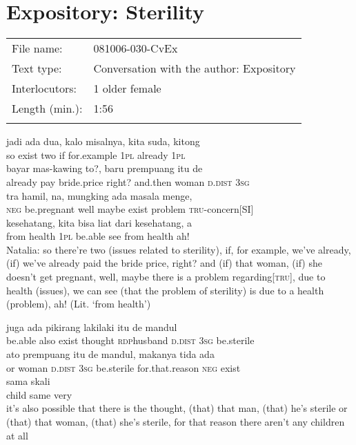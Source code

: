 \section{Expository: Sterility}
\label{Para_B.8}
\begin{tabular}{ll}
\lsptoprule
File name: &  081006-030-CvEx\\
Text type: &  Conversation with the author: Expository\\
Interlocutors: &  1 older female\\
Length (min.): &  1:56\\
\lspbottomrule
\end{tabular}
\setcounter{equation}{0}
\ea
{}   jadi    {ada}    {dua,}    {kalo}    {misalnya,}   kita    {suda,}    {kitong}\\
   {}   so    {exist}    {two}    {if}    {for.example}   \textsc{1pl}    {already}    {\textsc{1pl}}\\
    {bayar}    {mas-kawing}    {to?,}    {baru}    {prempuang}    {itu}   de\\
   {already}    {pay}    {bride.price}    {right?}    {and.then}    {woman}    {\textsc{d.dist}}   \textsc{3sg}\\
\gll tra    {hamil,}    {na,}    {mungking}    {ada}    {masala}    {menge,}\\
  \textsc{neg}    {be.pregnant}    {well}    {maybe}    {exist}    {problem}    {\textsc{tru}{}-concern[SI]}\\
    {kesehatang,}    {kita}    {bisa}    {liat}    {dari}    {kesehatang,}    {a}\\
   {from}    {health}    {\textsc{1pl}}    {be.able}    {see}    {from}    {health}    {ah!}\\
\glt
Natalia: so there’re two (issues related to sterility), if, for example, we’ve already, (if) we’ve already paid the bride price, right? and (if) that woman, (if) she doesn’t get pregnant, well, maybe there is a problem regarding[\textsc{tru}], due to health (issues), we can see (that the problem of sterility) is due to a health (problem), ah! (Lit. ‘from health’)
\z

\ea
{}    {juga}    {ada}    {pikirang}    {laki{\Tilde}laki}   itu   de    {mandul}\\
   {be.able}    {also}    {exist}    {thought}    {\textsc{rdp}{\Tilde}husband}   \textsc{d.dist}   \textsc{3sg}    {be.sterile}\\
\gll ato    {prempuang}    {itu}    {de}   mandul,    {makanya}   tida   ada\\
  or    {woman}    {\textsc{d.dist}}    {\textsc{3sg}}   be.sterile    {for.that.reason}   \textsc{neg}   exist\\
    {sama}    {skali}\\
   {child}    {same}    {very}\\
\glt
it’s also possible that there is the thought, (that) that man, (that) he’s sterile or (that) that woman, (that) she’s sterile, for that reason there aren’t any children at all
\z

